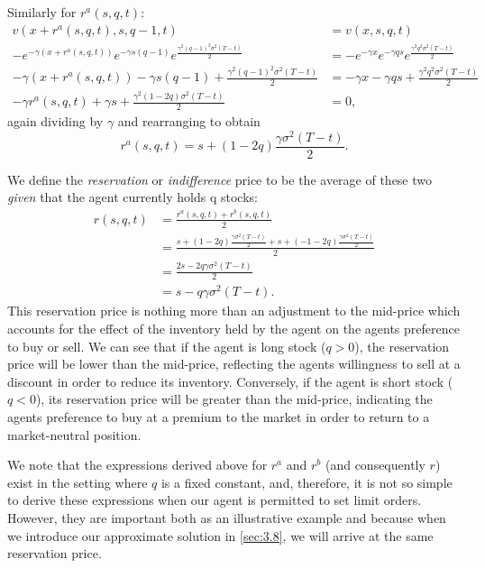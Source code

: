 Similarly for $r^a(s,q,t)$:
\begin{align*}
    v(x+r^a(s,q,t),s,q-1,t)&=v(x,s,q,t)\\
    -e^{-\gamma(x+r^a(s,q,t))}e^{-\gamma s(q-1)}e^{\frac{\gamma^2(q-1)^2\sigma^2(T-t)}{2}}&=-e^{-\gamma x}e^{-\gamma q s}e^{\frac{\gamma^2q^2\sigma^2(T-t)}{2}}\\
    -\gamma(x+r^a(s,q,t))-\gamma s(q-1)+\frac{\gamma^2(q-1)^2\sigma^2(T-t)}{2}&=-\gamma x-\gamma q s + \frac{\gamma^2q^2\sigma^2(T-t)}{2}\\
    -\gamma r^a(s,q,t) + \gamma s + \frac{\gamma^2(1-2q)\sigma^2(T-t)}{2}&=0,
\end{align*}
again dividing by $\gamma$ and rearranging to obtain
\begin{equation}
    r^a(s,q,t)=s+(1-2q)\frac{\gamma\sigma^2(T-t)}{2}.
\end{equation}

We define the \emph{reservation} or \emph{indifference} price to be the average of 
these two \textit{given} that the agent currently holds q stocks:
\begin{align*}
    r(s,q,t)&=\frac{r^a(s,q,t)+r^b(s,q,t)}{2}\\
    &=\frac{s+(1-2q)\frac{\gamma\sigma^2(T-t)}{2}+s+(-1-2q)\frac{\gamma\sigma^2(T-t)}{2}}{2}\\
    &=\frac{2s-2q\gamma\sigma^2(T-t)}{2}\\
    &=s-q\gamma\sigma^2(T-t).
\end{align*}
This reservation price is nothing more than an adjustment to the mid-price which accounts for the 
effect of the inventory held by the agent on the agents preference to buy or sell.
We can see that if the agent is long stock ($q>0$), the reservation price will be 
lower than the mid-price, reflecting the agents willingness to sell at a discount in 
order to reduce its inventory. Conversely, if the agent is short stock ($q<0$), its 
reservation price will be greater than the mid-price, indicating the agents preference
to buy at a premium to the market in order to return to a market-neutral position.

We note that the expressions derived above for $r^a$ and $r^b$ (and consequently $r$)
exist in the setting where $q$ is a fixed constant, and, therefore, it is not so simple
to derive these expressions when our agent is permitted to set limit orders. However,
they are important both as an illustrative example and because when we introduce our 
approximate solution in \ref{sec:3.8}, we will arrive at the same reservation price.

